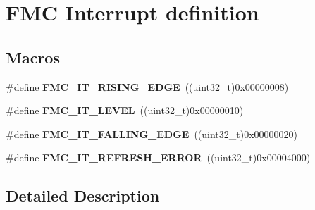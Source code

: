 \hypertarget{group___f_m_c___l_l___interrupt__definition}{}\section{F\+MC Interrupt definition}
\label{group___f_m_c___l_l___interrupt__definition}
\subsection*{Macros}
\begin{DoxyCompactItemize}
\item 
\#define {\bfseries F\+M\+C\+\_\+\+I\+T\+\_\+\+R\+I\+S\+I\+N\+G\+\_\+\+E\+D\+GE}~((uint32\+\_\+t)0x00000008)\hypertarget{group___f_m_c___l_l___interrupt__definition_ga6a73f7db63d0a0c1295916101954cfca}{}\label{group___f_m_c___l_l___interrupt__definition_ga6a73f7db63d0a0c1295916101954cfca}

\item 
\#define {\bfseries F\+M\+C\+\_\+\+I\+T\+\_\+\+L\+E\+V\+EL}~((uint32\+\_\+t)0x00000010)\hypertarget{group___f_m_c___l_l___interrupt__definition_ga6b575231b100951258acaebd3408101b}{}\label{group___f_m_c___l_l___interrupt__definition_ga6b575231b100951258acaebd3408101b}

\item 
\#define {\bfseries F\+M\+C\+\_\+\+I\+T\+\_\+\+F\+A\+L\+L\+I\+N\+G\+\_\+\+E\+D\+GE}~((uint32\+\_\+t)0x00000020)\hypertarget{group___f_m_c___l_l___interrupt__definition_gabb1de5c7521639d0f954aa8d7899d696}{}\label{group___f_m_c___l_l___interrupt__definition_gabb1de5c7521639d0f954aa8d7899d696}

\item 
\#define {\bfseries F\+M\+C\+\_\+\+I\+T\+\_\+\+R\+E\+F\+R\+E\+S\+H\+\_\+\+E\+R\+R\+OR}~((uint32\+\_\+t)0x00004000)\hypertarget{group___f_m_c___l_l___interrupt__definition_gad80be6ea9a033869214a46a0a92f223d}{}\label{group___f_m_c___l_l___interrupt__definition_gad80be6ea9a033869214a46a0a92f223d}

\end{DoxyCompactItemize}


\subsection{Detailed Description}
